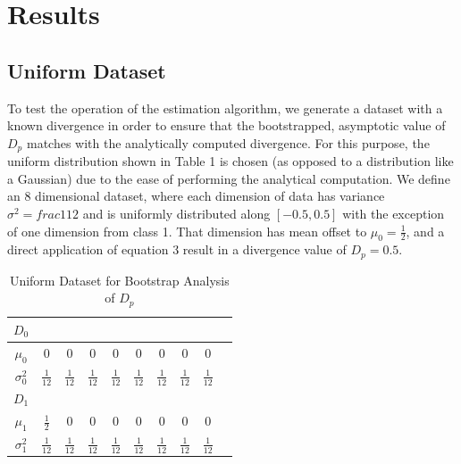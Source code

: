 \documentclass{article}
\begin{document}
	\section{Results}
	\subsection{\small Uniform Dataset}
	\noindent To test the operation of the estimation algorithm, we generate a dataset with a known divergence in order to ensure that the bootstrapped, asymptotic value of $D_p$ matches with the analytically computed divergence. For this purpose, the uniform distribution shown in Table 1 is chosen (as opposed to a distribution like a Gaussian) due to the ease of performing the analytical computation. We define an 8 dimensional dataset, where each dimension of data has variance $\sigma^2=frac{1}{12}$ and is uniformly distributed along $[-0.5,0.5]$ with the exception of one dimension from class 1. That dimension has mean offset to $\mu_0=\frac{1}{2}$, and a direct application of equation 3 result in a divergence value of $D_p=0.5$.
	
	
	\begin{table}[ht]
		\caption{Uniform Dataset for Bootstrap Analysis of $D_p$}
		\centering %
		\begin{tabular}{c c c c c c c c c c} %
			$D_0$ &  &  &  \\ [0.5ex] %
			\hline %
			$\mu_0$ & 0 & 0 & 0 & 0 & 0 & 0 & 0 & 0\\[0.5ex] %
			$\sigma_0^2$ & \( \frac{1}{12} \) & \( \frac{1}{12} \) & \( \frac{1}{12} \) & \( \frac{1}{12} \) & \( \frac{1}{12} \) & \( \frac{1}{12} \) & \( \frac{1}{12} \) & \( \frac{1}{12} \) &  \\[2ex]
			
			$D_1$ & \\ [0.5ex]
			
			\hline
			$\mu_1$ & \( \frac{1}{2} \) & 0 & 0 & 0 & 0 & 0 & 0 & 0\\[0.5ex] %
			$\sigma_1^2$ & \( \frac{1}{12} \) & \( \frac{1}{12} \) & \( \frac{1}{12} \) & \( \frac{1}{12} \) & \( \frac{1}{12} \) & \( \frac{1}{12} \) & \( \frac{1}{12} \) & \( \frac{1}{12} \) &  \\ [1ex] %
			\hline %
		\end{tabular}
		\label{table:nonlin} %
	\end{table}
	
\end{document}
